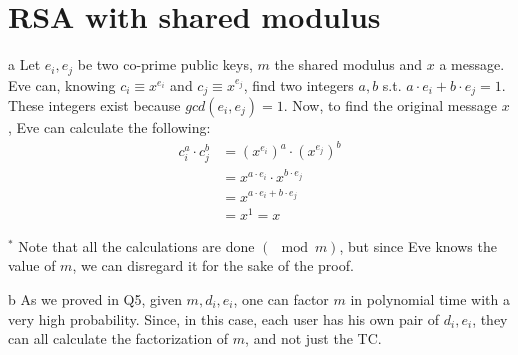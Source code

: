 \documentclass{article}
\begin{document}
\section{RSA with shared modulus}
\begin{paragraph}
	a Let \(e_i, e_j\) be two co-prime public keys, \(m\) the shared modulus and \(x\) a message. Eve can, knowing \(c_i \equiv x^{e_i}\) and \(c_j \equiv x^{e_j}\), find two integers \(a, b\) s.t. \(a \cdot e_i + b \cdot e_j = 1\). These integers exist because \(gcd(e_i, e_j) = 1\). Now, to find the original message \(x\), Eve can calculate the following:
	\begin{align*}
	    c_i^a \cdot c_j^b &= (x^{e_i})^a \cdot (x^{e_j})^b\\
	    &= x^{a \cdot e_i} \cdot x^{b \cdot e_j}\\
	    &= x^{a \cdot e_i + b \cdot e_j}\\
	    &= x^1 = x
	\end{align*}
	
	\(^*\) Note that all the calculations are done \((\mod{m})\), but since Eve knows the value of \(m\), we can disregard it for the sake of the proof.
\end{paragraph}

\begin{paragraph}
    b As we proved in Q5, given \(m, d_i, e_i\), one can factor \(m\) in polynomial time with a very high probability. Since, in this case, each user has his own pair of \(d_i, e_i\), they can all calculate the factorization of \(m\), and not just the TC.
\end{paragraph}
\end{document}
